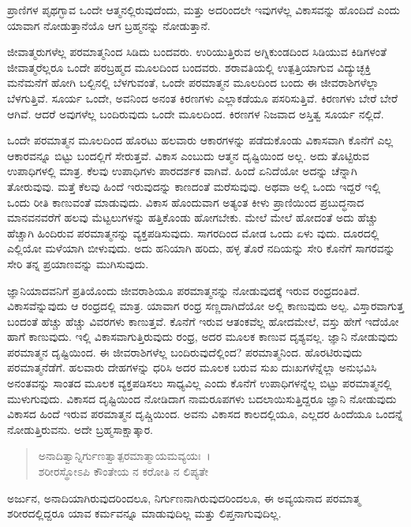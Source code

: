 {\small ಪ್ರಾಣಿಗಳ ಪೃಥಗ್ಭಾವ ಒಂದೇ ಆತ್ಮನಲ್ಲಿರುವುದೆಂದು, ಮತ್ತು ಅದರಿಂದಲೇ ಇವುಗಳೆಲ್ಲ ವಿಕಾಸವನ್ನು ಹೊಂದಿದೆ ಎಂದು ಯಾವಾಗ ನೋಡುತ್ತಾನೆಯೊ ಆಗ ಬ್ರಹ್ಮನನ್ನು ನೋಡುತ್ತಾನೆ.}

ಜೀವಾತ್ಮರುಗಳೆಲ್ಲ ಪರಮಾತ್ಮನಿಂದ ಸಿಡಿದು ಬಂದವರು. ಉರಿಯುತ್ತಿರುವ ಅಗ್ನಿಕುಂಡದಿಂದ ಸಿಡಿಯುವ ಕಿಡಿಗಳಂತೆ ಜೀವಾತ್ಮರೆಲ್ಲರೂ ಒಂದೇ ಪರಬ್ರಹ್ಮದ ಮೂಲದಿಂದ ಬಂದವರು. ಶರಾವತಿಯಲ್ಲಿ ಉತ್ಪತ್ತಿಯಾಗುವ ವಿದ್ಯುಚ್ಛಕ್ತಿ ಮನೆಮನೆಗೆ ಹೋಗಿ ಬಲ್ಬಿನಲ್ಲಿ ಬೆಳಗುವಂತೆ, ಒಂದೇ ಪರಮಾತ್ಮನ ಮೂಲದಿಂದ ಬಂದು ಈ ಜೀವರಾಶಿಗಳೆಲ್ಲಾ ಬೆಳಗುತ್ತಿವೆ. ಸೂರ್ಯ ಒಂದೇ, ಅವನಿಂದ ಅನಂತ ಕಿರಣಗಳು ಎಲ್ಲಾಕಡೆಯೂ ಪಸರಿಸುತ್ತಿವೆ. ಕಿರಣಗಳು ಬೇರೆ ಬೇರೆ ಆಗಿವೆ. ಆದರೆ ಅವುಗಳೆಲ್ಲ ಬಂದಿರುವುದು ಒಂದೇ ಮೂಲದಿಂದ. ಕಿರಣಗಳ ನಿಜವಾದ ಅಸ್ತಿತ್ವ ಸೂರ್ಯ ನಲ್ಲಿದೆ.

ಒಂದೇ ಪರಮಾತ್ಮನ ಮೂಲದಿಂದ ಹೊರಟು ಹಲವಾರು ಆಕಾರಗಳನ್ನು ಪಡೆದುಕೊಂಡು ವಿಕಾಸವಾಗಿ ಕೊನೆಗೆ ಎಲ್ಲ ಆಕಾರವನ್ನೂ ಬಿಟ್ಟು ಬಂದಲ್ಲಿಗೆ ಸೇರುತ್ತವೆ. ವಿಕಾಸ ಎಂಬುದು ಆತ್ಮನ ದೃಷ್ಟಿಯಿಂದ ಅಲ್ಲ. ಅದು ತೊಟ್ಟಿರುವ ಉಪಾಧಿಗಳಲ್ಲಿ ಮಾತ್ರ. ಕೆಲವು ಉಪಾಧಿಗಳು ಪಾರದರ್ಶಕ ವಾಗಿವೆ. ಹಿಂದೆ ಏನಿದೆಯೋ ಅದನ್ನು ಚೆನ್ನಾಗಿ ತೋರುವುವು. ಮತ್ತೆ ಕೆಲವು ಹಿಂದೆ ಇರುವುದನ್ನು ಕಾಣದಂತೆ ಮರೆಸುವುವು. ಅಥವಾ ಅಲ್ಲಿ ಒಂದು ಇದ್ದರೆ ಇಲ್ಲಿ ಒಂದು ರೀತಿ ಕಾಣುವಂತೆ ಮಾಡುವುದು. ವಿಕಾಸ ಹೊಂದುವಾಗ ಅತ್ಯಂತ ಕೀಳು ಪ್ರಾಣಿಯಿಂದ ಪ್ರಬುದ್ಧನಾದ ಮಾನವನವರೆಗೆ ಹಲವು ಮೆಟ್ಟಲುಗಳನ್ನು ಹತ್ತಿಕೊಂಡು ಹೋಗಬೇಕು. ಮೇಲೆ ಮೇಲೆ ಹೋದಂತೆ ಅದು ಹೆಚ್ಚು ಹೆಚ್ಚಾಗಿ ಹಿಂದಿರುವ ಪರಮಾತ್ಮನನ್ನು ವ್ಯಕ್ತಪಡಿಸುವುದು. ಸಾಗರದಿಂದ ಮೋಡ ಒಂದು ಏಳು ವುದು. ದೂರದಲ್ಲಿ ಎಲ್ಲಿಯೋ ಮಳೆಯಾಗಿ ಬೀಳುವುದು. ಅದು ಹನಿಯಾಗಿ ಹರಿದು, ಹಳ್ಳ ತೊರೆ ನದಿಯನ್ನು ಸೇರಿ ಕೊನೆಗೆ ಸಾಗರವನ್ನು ಸೇರಿ ತನ್ನ ಪ್ರಯಾಣವನ್ನು ಮುಗಿಸುವುದು.

ಜ್ಞಾನಿಯಾದವನಿಗೆ ಪ್ರತಿಯೊಂದು ಜೀವರಾಶಿಯೂ ಪರಮಾತ್ಮನನ್ನು ನೋಡುವುದಕ್ಕೆ ಇರುವ ರಂಧ್ರದಂತಿದೆ. ವಿಕಾಸವೆನ್ನುವುದು ಆ ರಂಧ್ರದಲ್ಲಿ ಮಾತ್ರ. ಯಾವಾಗ ರಂಧ್ರ ಸಣ್ಣದಾಗಿದೆಯೋ ಅಲ್ಲಿ ಕಾಣುವುದು ಅಲ್ಪ. ವಿಸ್ತಾರವಾಗುತ್ತ ಬಂದಂತೆ ಹೆಚ್ಚು ಹೆಚ್ಚು ವಿವರಗಳು ಕಾಣುತ್ತವೆ. ಕೊನೆಗೆ ಇರುವ ಆತಂಕವೆಲ್ಲ ಹೋದಮೇಲೆ, ವಸ್ತು ಹೇಗೆ ಇದೆಯೋ ಹಾಗೆ ಕಾಣುವುದು. ಇಲ್ಲಿ ವಿಕಾಸವಾಗುತ್ತಿರುವುದು ರಂಧ್ರ, ಅದರ ಮೂಲಕ ಕಾಣುವ ದೃಶ್ಯವಲ್ಲ. ಜ್ಞಾನಿ ನೋಡುವುದು ಪರಮಾತ್ಮನ ದೃಷ್ಟಿಯಿಂದ. ಈ ಜೀವರಾಶಿಗಳೆಲ್ಲ ಬಂದಿರುವುದೆಲ್ಲಿಂದ? ಪರಮಾತ್ಮನಿಂದ. ಹೊರಟಿರುವುದು ಪರಮಾತ್ಮನೆಡೆಗೆ. ಹಲವಾರು ದೇಹಗಳನ್ನು ಧರಿಸಿ ಅದರ ಮೂಲಕ ಬರುವ ಸುಖ ದುಃಖಗಳೆನ್ನೆಲ್ಲಾ ಅನುಭವಿಸಿ ಅನಂತವನ್ನು ಸಾಂತದ ಮೂಲಕ ವ್ಯಕ್ತಪಡಿಸಲು ಸಾಧ್ಯವಿಲ್ಲ ಎಂದು ಕೊನೆಗೆ ಉಪಾಧಿಗಳನ್ನೆಲ್ಲ ಬಿಟ್ಟು ಪರಮಾತ್ಮನಲ್ಲಿ ಮುಳುಗುವುದು. ವಿಕಾಸದ ದೃಷ್ಟಿಯಿಂದ ನೋಡಿದಾಗ ನಾಮರೂಪಗಳು ಬದಲಾಯಿಸುತ್ತಿದ್ದರೂ ಜ್ಞಾನಿ ನೋಡುವುದು ವಿಕಾಸದ ಹಿಂದೆ ಇರುವ ಪರಮಾತ್ಮನ ದೃಷ್ಚಿಯಿಂದ. ಅವನು ವಿಕಾಸದ ಕಾಲದಲ್ಲಿಯೂ, ಎಲ್ಲದರ ಹಿಂದೆಯೂ ಒಂದನ್ನೆ ನೋಡುತ್ತಿರುವನು. ಅದೇ ಬ್ರಹ್ಮಸಾಕ್ಷಾತ್ಕಾರ.

\begin{verse}
ಅನಾದಿತ್ವಾನ್ನಿರ್ಗುಣತ್ವಾತ್ಪರಮಾತ್ಮಾಯಮವ್ಯಯಃ~।\\ಶರೀರಸ್ಥೋಽಪಿ ಕೌಂತೇಯ ನ ಕರೋತಿ ನ ಲಿಪ್ಯತೇ 
\end{verse}

{\small ಅರ್ಜುನ, ಅನಾದಿಯಾಗಿರುವುದರಿಂದಲೂ, ನಿರ್ಗುಣನಾಗಿರುವುದರಿಂದಲೂ, ಈ ಅವ್ಯಯನಾದ ಪರಮಾತ್ಮ ಶರೀರದಲ್ಲಿದ್ದರೂ ಯಾವ ಕರ್ಮವನ್ನೂ ಮಾಡುವುದಿಲ್ಲ ಮತ್ತು ಲಿಪ್ತನಾಗುವುದಿಲ್ಲ.}

